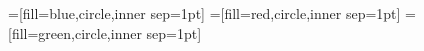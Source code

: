 \documentclass[18pt]{beamer}
\def \loose {15pt}
\begin{document}
=[fill=blue,circle,inner sep=1pt]
=[fill=red,circle,inner sep=1pt]
=[fill=green,circle,inner sep=1pt]

%
%    
%    
%    
%    
%        
\end{document}
